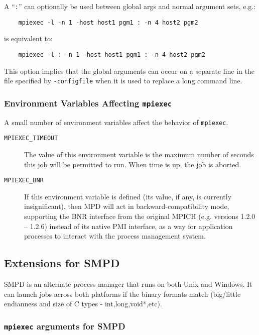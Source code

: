 \documentclass[dvipdfm,11pt]{article}
\begin{document}
A ``\texttt{:}'' can optionally be used between global args
and normal argument sets, e.g.:
\begin{verbatim}
    mpiexec -l -n 1 -host host1 pgm1 : -n 4 host2 pgm2
\end{verbatim}
is equivalent to:
\begin{verbatim}
    mpiexec -l : -n 1 -host host1 pgm1 : -n 4 host2 pgm2
\end{verbatim}
This option implies that the global arguments can occur on a separate
line in the file specified by \texttt{-configfile} when it is used to 
replace a long command line.

\subsubsection{Environment Variables Affecting \texttt{mpiexec}}
\label{sec:mpd-mpiexec-env}

A small number of environment variables affect the behavior of
\texttt{mpiexec}. 

\begin{description}
\item[\texttt{MPIEXEC\_TIMEOUT}] The value of this environment variable is the
  maximum number of seconds this job will be permitted to run.  When
  time is up, the job is aborted. 
\item[\texttt{MPIEXEC\_BNR}] If this environment variable is defined
  (its value, if any, is currently insignificant), then MPD will act in
  backward-compatibility mode, supporting the BNR interface from the
  original MPICH (e.g. versions 1.2.0 -- 1.2.6)
  instead of its native PMI interface, as a way for application
  processes to interact with the process management system.
\end{description}


\subsection{Extensions for SMPD}
\label{sec:extensions-smpd}

SMPD is an alternate process manager that runs on both Unix and Windows.
It can launch jobs across both platforms if the binary formats match 
(big/little endianness and size of C types - int,long,void*,etc).


\subsubsection{\texttt{mpiexec} arguments for SMPD}
\label{sec:mpiexec-smpd}
\end{document}
